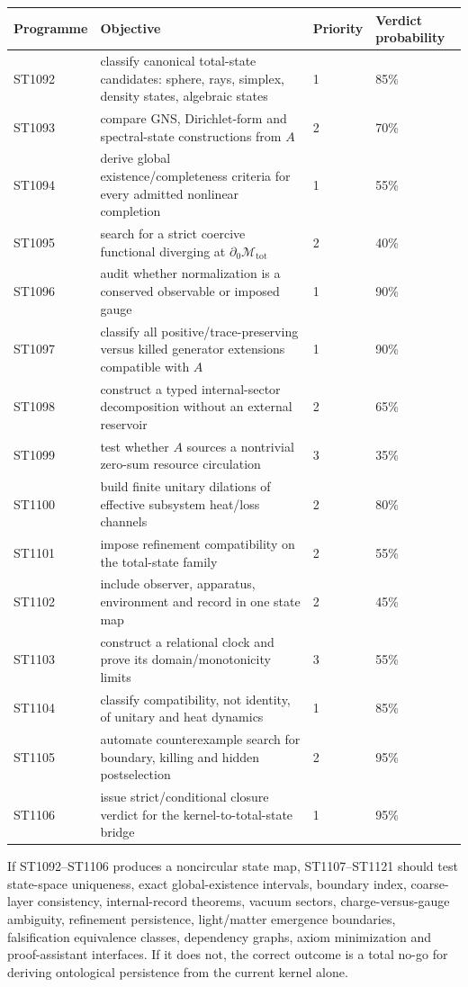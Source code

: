 \documentclass[11pt,a4paper]{article}
\newcommand{\Mtot}{\mathcal M_{\mathrm{tot}}}
\begin{document}
\begin{longtable}{@{}p{}p{}p{}p{}@{}}
\toprule
Programme & Objective & Priority & Verdict probability \\
\midrule\endhead
ST1092 & classify canonical total-state candidates: sphere, rays, simplex, density states, algebraic states & 1 & 85\% \\
ST1093 & compare GNS, Dirichlet-form and spectral-state constructions from $A$ & 2 & 70\% \\
ST1094 & derive global existence/completeness criteria for every admitted nonlinear completion & 1 & 55\% \\
ST1095 & search for a strict coercive functional diverging at $\partial_0\Mtot$ & 2 & 40\% \\
ST1096 & audit whether normalization is a conserved observable or imposed gauge & 1 & 90\% \\
ST1097 & classify all positive/trace-preserving versus killed generator extensions compatible with $A$ & 1 & 90\% \\
ST1098 & construct a typed internal-sector decomposition without an external reservoir & 2 & 65\% \\
ST1099 & test whether $A$ sources a nontrivial zero-sum resource circulation & 3 & 35\% \\
ST1100 & build finite unitary dilations of effective subsystem heat/loss channels & 2 & 80\% \\
ST1101 & impose refinement compatibility on the total-state family & 2 & 55\% \\
ST1102 & include observer, apparatus, environment and record in one state map & 2 & 45\% \\
ST1103 & construct a relational clock and prove its domain/monotonicity limits & 3 & 55\% \\
ST1104 & classify compatibility, not identity, of unitary and heat dynamics & 1 & 85\% \\
ST1105 & automate counterexample search for boundary, killing and hidden postselection & 2 & 95\% \\
ST1106 & issue strict/conditional closure verdict for the kernel-to-total-state bridge & 1 & 95\% \\
\bottomrule
\end{longtable}

If ST1092--ST1106 produces a noncircular state map, ST1107--ST1121 should test
state-space uniqueness, exact global-existence intervals, boundary index,
coarse-layer consistency, internal-record theorems, vacuum sectors,
charge-versus-gauge ambiguity, refinement persistence, light/matter emergence
boundaries, falsification equivalence classes, dependency graphs, axiom
minimization and proof-assistant interfaces.  If it does not, the correct
outcome is a total no-go for deriving ontological persistence from the current
kernel alone.
\end{document}
